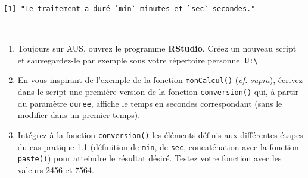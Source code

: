 \documentclass[12pt,twosided, notitlepage]{book}
\newenvironment{Shaded}{}{}
\newcommand{\CommentTok}[1]{\textcolor[rgb]{0.00,0.50,0.00}{#1}}
\newcommand{\ControlFlowTok}[1]{\textcolor[rgb]{0.00,0.00,1.00}{#1}}
\newcommand{\DecValTok}[1]{#1}
\newcommand{\KeywordTok}[1]{\textcolor[rgb]{0.00,0.00,1.00}{#1}}
\newcommand{\NormalTok}[1]{#1}
\newcommand{\StringTok}[1]{\textcolor[rgb]{0.00,0.50,0.50}{#1}}
\newif \ifsol
\renewenvironment{Shaded}{\begin{snugshade}}{\end{snugshade}}
\begin{document}
\begin{verbatim}
[1] "Le traitement a duré `min` minutes et `sec` secondes."
\end{verbatim}

~

\begin{enumerate}
\def\labelenumi{\alph{enumi}.}
\item
  Toujours sur AUS, ouvrez le programme \textbf{RStudio}. Créez un
  nouveau script et sauvegardez-le par exemple sous votre répertoire
  personnel \texttt{U:\textbackslash{}}.
\item
  En vous inspirant de l'exemple de la fonction \texttt{monCalcul()}
  (\emph{cf.} \emph{supra}), écrivez dans le script une première version
  de la fonction \texttt{conversion()} qui, à partir du paramètre
  \texttt{duree}, affiche le temps en secondes correspondant (sans le
  modifier dans un premier temps).

  \ifsol 

  \begin{center} \rule{0.5\linewidth}{\linethickness}\end{center}

\begin{Shaded}
\begin{Highlighting}[]
\CommentTok{# La structure de base d'une définition de fonction est simple :}
\CommentTok{# l'opérateur d'assignation est utilisé pour associer à un nom}
\CommentTok{# le code de la fonction}
\NormalTok{conversion <-}\StringTok{ }\ControlFlowTok{function}\NormalTok{(duree)\{}
  \KeywordTok{return}\NormalTok{(duree)}
\NormalTok{\}}
\CommentTok{# Dans cette première version, on ne fait que renvoyer la valeur}
\CommentTok{# de duree à l'identique.}
\KeywordTok{conversion}\NormalTok{(}\DecValTok{2456}\NormalTok{)}
\NormalTok{  ## [1] 2456}
\end{Highlighting}
\end{Shaded}

  \begin{center} \rule{0.5\linewidth}{\linethickness}\end{center} 
    \bigskip 
    \fi
\item
  Intégrez à la fonction \texttt{conversion()} les éléments définis aux
  différentes étapes du cas pratique 1.1 (définition de \texttt{min}, de
  \texttt{sec}, concaténation avec la fonction \texttt{paste()}) pour
  atteindre le résultat désiré. Testez votre fonction avec les valeurs
  2456 et 7564.


\end{enumerate}
\end{document}
